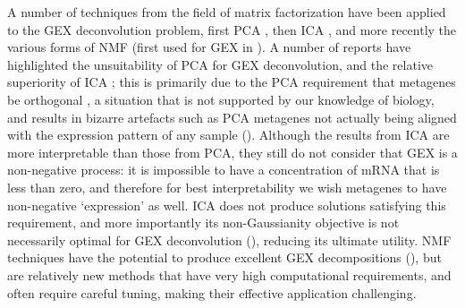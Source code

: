 \documentclass[dissertation.tex]{subfiles}
\begin{document}
A number of techniques from the field of matrix factorization have been applied to the \gls{GEX} deconvolution problem, first \gls{PCA} \cite{Alter2000}, then \gls{ICA} \cite{Liebermeister2002}, and more recently the various forms of \gls{NMF} (first used for \gls{GEX} in \cite{Brunet2004}).  A number of reports have highlighted the unsuitability of \gls{PCA} for \gls{GEX} deconvolution, and the relative superiority of \gls{ICA} \cite{Lee2003, Saidi2004, Teschendorff2007}; this is primarily due to the \gls{PCA} requirement that metagenes be orthogonal \cite{Lewicki2000}, a situation that is not supported by our knowledge of biology, and results in bizarre artefacts such as \gls{PCA} metagenes not actually being aligned with the expression pattern of any sample ().  Although the results from \gls{ICA} are more interpretable than those from \gls{PCA}, they still do not consider that \gls{GEX} is a non-negative process: it is impossible to have a concentration of mRNA that is less than zero, and therefore for best interpretability we wish metagenes to have non-negative `expression' as well.  \gls{ICA} does not produce solutions satisfying this requirement, and more importantly its non-Gaussianity objective is not necessarily optimal for \gls{GEX} deconvolution (), reducing its ultimate utility.  \gls{NMF} techniques have the potential to produce excellent \gls{GEX} decompositions (), but are relatively new methods that have very high computational requirements, and often require careful tuning, making their effective application challenging.
\end{document}
